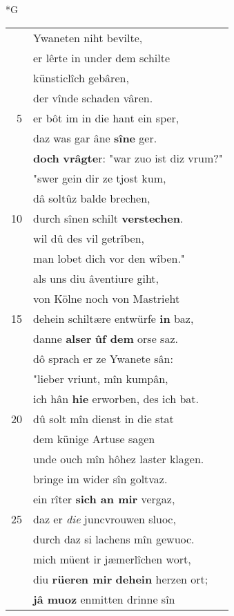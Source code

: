 \documentclass[8pt,a4paper,notitlepage]{article}
\begin{document}
\begin{table}[ht]
\begin{minipage}[t]{0.5\linewidth}
\small
\begin{center}*G
\end{center}
\begin{tabular}{rl}
 & Ywaneten niht bevilte,\\ 
 & er lêrte in under dem schilte\\ 
 & künsticlîch gebâren,\\ 
 & der vînde schaden vâren.\\ 
5 & er bôt im in die hant ein sper,\\ 
 & daz was gar âne \textbf{sîne} ger.\\ 
 & \textbf{doch} \textbf{vrâgte}r: "war zuo ist diz vrum?"\\ 
 & "swer gein dir ze tjost kum,\\ 
 & dâ soltûz balde brechen,\\ 
10 & durch sînen schilt \textbf{verstechen}.\\ 
 & wil dû des vil getrîben,\\ 
 & man lobet dich vor den wîben."\\ 
 & als uns diu âventiure giht,\\ 
 & von Kölne noch von Mastrieht\\ 
15 & dehein schiltære entwürfe \textbf{in} baz,\\ 
 & danne \textbf{alser} \textbf{ûf dem} orse saz.\\ 
 & dô sprach er ze Ywanete sân:\\ 
 & "lieber vriunt, mîn kumpân,\\ 
 & ich hân \textbf{hie} erworben, des ich bat.\\ 
20 & dû solt mîn dienst in die stat\\ 
 & dem künige Artuse sagen\\ 
 & unde ouch mîn hôhez laster klagen.\\ 
 & bringe im wider sîn goltvaz.\\ 
 & ein rîter \textbf{sich an mir} vergaz,\\ 
25 & daz er \textit{die} juncvrouwen sluoc,\\ 
 & durch daz si lachens mîn gewuoc.\\ 
 & mich müent ir jæmerlîchen wort,\\ 
 & diu \textbf{rüeren mir} \textbf{dehein} herzen ort;\\ 
 & \textbf{jâ muoz} enmitten drinne sîn\\ 

\end{tabular}
\end{minipage}
\end{table}
\end{document}

